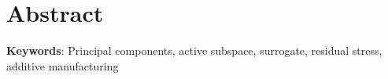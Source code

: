 \section*{Abstract}
\bigskip

\noindent \textbf{Keywords}: Principal components, active subspace, surrogate, residual stress, additive manufacturing
